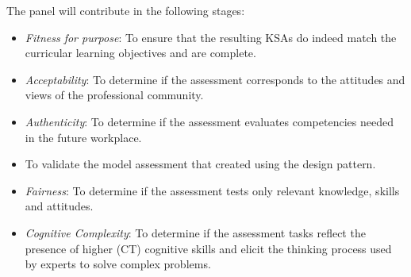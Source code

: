 The panel will contribute in the following stages:
\begin{itemize}
\item \emph{Fitness for purpose}: To ensure that the resulting KSAs do indeed match the curricular learning objectives and are complete.
\item \emph{Acceptability}: To determine if the assessment corresponds to the attitudes and views of the professional community.
\item \emph{Authenticity}: To determine if the assessment evaluates competencies needed in the future workplace.\item To validate the model assessment that created using the design pattern.
\item \emph{Fairness}: To determine if the assessment tests only relevant knowledge, skills and attitudes.
\item \emph{Cognitive Complexity}: To determine if the assessment tasks reflect the presence of higher (CT) cognitive skills and elicit the thinking process used by experts to solve complex problems.
\end{itemize}



